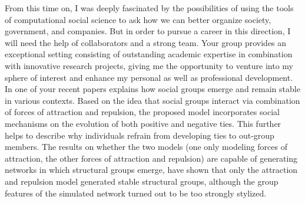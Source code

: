 From this time on, I was deeply fascinated by the possibilities of using the tools of computational social science to ask how we can better organize society, government, and companies. 
But in order to pursue a career in this direction, I will need the help of collaborators and a strong team. 
Your group provides an exceptional setting consisting of outstanding academic expertise in combination with innovative research projects, giving me the opportunity to venture into my sphere of interest and enhance my personal as well as professional development.
In one of your recent papers  \cite{stadtfeld2020emergence} explains how social groups emerge and remain stable in various contexts.
Based on the idea that social groups interact via combination of forces of attraction and repulsion, the proposed model incorporates social mechanisms on the evolution of both positive and negative ties.
This further helps to describe why individuals refrain from developing ties to out-group members.
The results on whether the two models (one only modeling forces of attraction, the other forces of attraction and repulsion) are capable of generating networks in which structural groups emerge, have shown that only the attraction and repulsion model generated stable structural groups, although the group features of the simulated network turned out to be too strongly stylized.\\

